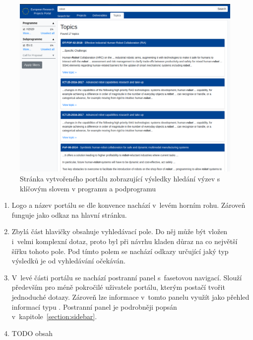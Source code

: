 \begin{figure}[H]
	\centering
	\includegraphics[width=\textwidth]{obrazky-figures/my-results.png}
	\caption{Stránka vytvořeného portálu zobrazující výsledky hledání výzev s klíčovým slovem  v programu  a podprogramu }
	\label{image:portal-results}
\end{figure}
\begin{enumerate}
    \item Logo a název portálu se dle konvence nachází v~levém horním rohu. Zároveň funguje jako odkaz na hlavní stránku.
    \item Zbylá část hlavičky obsahuje vyhledávací pole. Do něj může být vložen i~velmi komplexní dotaz, proto byl při návrhu kladen důraz na co největší šířku tohoto pole. Pod tímto polem se nachází odkazy určující jaký typ výsledků je od vyhledávání očekáván.
    \item V~levé části portálu se nachází postranní panel s~fasetovou navigací. Slouží především pro méně pokročilé uživatele portálu, kterým postačí tvořit jednoduché dotazy. Zároveň lze informace v~tomto panelu využít jako přehled informací typu . Postranní panel je podrobněji popsán v~kapitole~\ref{section:sidebar}.
    \item TODO obsah
\end{enumerate}



